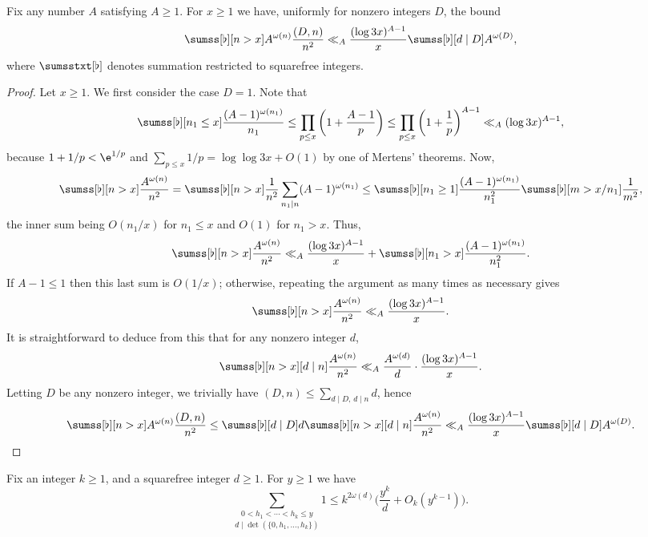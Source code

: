 \documentclass[12pt, reqno, twoside, letterpaper]{amsart}
\begin{document}
\begin{jetsam}
\begin{lemma} 
 \label{Jlem:omegabnd}
%
Fix any number $A$ satisfying $A \ge 1$.
%
For $x \ge 1$ we have, uniformly for nonzero integers $D$, the 
bound 
\[
 \sumss[\flat][n > x]
  A^{\omega(n)}
   \frac{(D,n)}{n^2}
    \ll_A
     \frac{(\log 3x)^{A - 1}}{x}
      \sumss[\flat][d \mid D] A^{\omega(D)},
\]
where $\sumsstxt[\flat]$ denotes summation restricted to 
squarefree integers.
\end{lemma}

\begin{proof}
%
Let $x \ge 1$.
%
We first consider the case $D = 1$.
%
Note that   
\begin{equation}
 \label{Jeq:mert}
 \sumss[\flat][n_1 \le x] 
  \frac{(A - 1)^{\omega(n_1)}}{n_1}
   \le 
    \prod_{p \le x}
     \bigg(1 + \frac{A - 1}{p}\bigg)
      \le 
       \prod_{p \le x} 
        \bigg(1 + \frac{1}{p}\bigg)^{A - 1}
         \ll_A
          (\log 3x)^{A - 1},
\end{equation}
because 
$1 + 1/p < \e^{1/p}$ and 
$\sum_{p \le x} 1/p = \log\log 3x + O(1)$ by one of Mertens' 
theorems.
%
Now, 
\[
 \sumss[\flat][n > x] \frac{A^{\omega(n)}}{n^2}
  =
   \sumss[\flat][n > x] 
    \frac{1}{n^2}
     \sum_{n_1 \mid n} (A - 1)^{\omega(n_1)}
      \le 
       \sumss[\flat][n_1 \ge 1]
        \frac{(A - 1)^{\omega(n_1)}}{n_1^2}
         \sumss[\flat][m > x/n_1]
          \frac{1}{m^2},
\]
the inner sum being $O(n_1/x)$ for $n_1 \le x$ and $O(1)$ for 
$n_1 > x$. 
%
Thus, 
\[
 \sumss[\flat][n > x] \frac{A^{\omega(n)}}{n^2}
  \ll_A
   \frac{(\log 3x)^{A - 1}}{x}
    +
     \sumss[\flat][n_1 > x]
      \frac{(A - 1)^{\omega(n_1)}}{n_1^2}.
\]
%
If $A - 1 \le 1$ then this last sum is $O(1/x)$; otherwise, 
repeating the argument as many times as necessary gives
\[
 \sumss[\flat][n > x] \frac{A^{\omega(n)}}{n^2}
  \ll_A
   \frac{(\log 3x)^{A - 1}}{x}.
\]
%
It is straightforward to deduce from this that for any nonzero 
integer $d$, 
\[
 \sumss[\flat][n > x][d \mid n] \frac{A^{\omega(n)}}{n^2}
  \ll_A
   \frac{A^{\omega(d)}}{d}\cdot 
    \frac{(\log 3x)^{A - 1}}{x}.
\]
%
Letting $D$ be any nonzero integer, we trivially have 
$(D,n) \le \sum_{d \mid D, \, d \mid n} d$, hence
%
\[
 \sumss[\flat][n > x]
  A^{\omega(n)} \frac{(D,n)}{n^2}
   \le 
    \sumss[\flat][d \mid D] d 
     \sumss[\flat][n > x][d \mid n] \frac{A^{\omega(n)}}{n^2}
      \ll_A 
       \frac{(\log 3x)^{A - 1}}{x}
        \sumss[\flat][d \mid D] A^{\omega(D)}.
\]
\end{proof}

\begin{lemma}
 \label{Jlem:dethap}
%
Fix an integer $k \ge 1$, and a squarefree integer $d \ge 1$.
%
For $y \ge 1$ we have
\[
 \underset{d \mid \det(\{0,h_1,\ldots,h_k\})}
  { 
   \sum_{0 < h_1 < \cdots < h_k \le y}
  } 1
  \le 
   k^{2\omega(d)}
    \bigg(\frac{y^k}{d} + O_k(y^{k - 1})\bigg).
\]
\end{lemma}


\end{jetsam}
\end{document}
